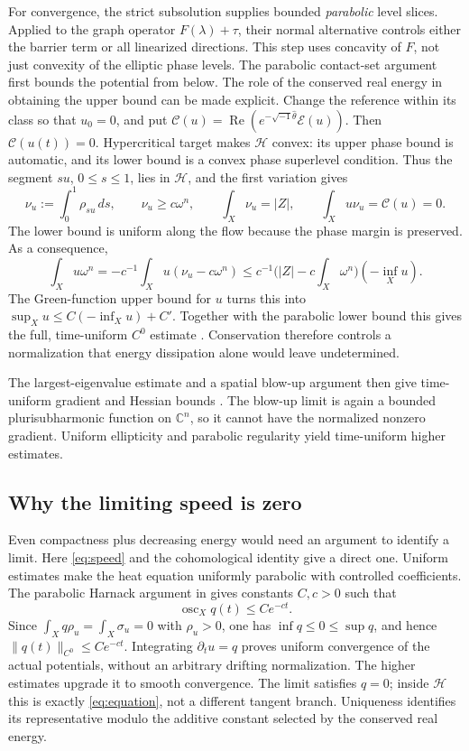 \documentclass[12pt,reqno]{amsart}
\newcommand{\ii}{\sqrt{-1}}
\newcommand{\C}{\mathbb C}
\newcommand{\hth}{\widehat\theta}
\newcommand{\osc}{\operatorname{osc}}
\newcommand{\Ree}{\operatorname{Re}}
\begin{document}
For convergence, the strict subsolution supplies bounded \emph{parabolic} level slices. Applied to the graph operator $F(\lambda)+\tau$, their normal alternative controls either the barrier term or all linearized directions. This step uses concavity of $F$, not just convexity of the elliptic phase levels. The parabolic contact-set argument first bounds the potential from below. The role of the conserved real energy in obtaining the upper bound can be made explicit. Change the reference within its class so that $u_0=0$, and put $\mathcal C(u)=\Ree(e^{-\ii\hth}\mathcal E(u))$. Then $\mathcal C(u(t))=0$. Hypercritical target makes $\mathcal H$ convex: its upper phase bound is automatic, and its lower bound is a convex phase superlevel condition. Thus the segment $su$, $0\leq s\leq1$, lies in $\mathcal H$, and the first variation gives
\[
 \nu_u:=\int_0^1\rho_{su}\,ds,\qquad
 \nu_u\geq c\omega^n,\qquad \int_X\nu_u=|Z|,
 \qquad \int_Xu\nu_u=\mathcal C(u)=0.
\]
The lower bound is uniform along the flow because the phase margin is preserved. As a consequence,
\[
 \int_Xu\omega^n=-c^{-1}\int_Xu(\nu_u-c\omega^n)
 \leq c^{-1}\bigl(|Z|-c\int_X\omega^n\bigr)(-\inf_Xu).
\]
The Green-function upper bound for $u$ turns this into $\sup_Xu\leq C(-\inf_Xu)+C'$. Together with the parabolic lower bound this gives the full, time-uniform $C^0$ estimate \cite[Proposition 2.4 and Lemma 5.3]{Tak}. Conservation therefore controls a normalization that energy dissipation alone would leave undetermined.

The largest-eigenvalue estimate and a spatial blow-up argument then give time-uniform gradient and Hessian bounds \cite[Section 5.2]{Tak}. The blow-up limit is again a bounded plurisubharmonic function on $\C^n$, so it cannot have the normalized nonzero gradient. Uniform ellipticity and parabolic regularity yield time-uniform higher estimates.

\subsection{Why the limiting speed is zero}
Even compactness plus decreasing energy would need an argument to identify a limit. Here \eqref{eq:speed} and the cohomological identity give a direct one. Uniform estimates make the heat equation uniformly parabolic with controlled coefficients. The parabolic Harnack argument in \cite[Section 5.3]{Tak} gives constants $C,c>0$ such that
\[
 \osc_Xq(t)\leq Ce^{-ct}.
\]
Since $\int_Xq\rho_u=\int_X\sigma_u=0$ with $\rho_u>0$, one has $\inf q\leq0\leq\sup q$, and hence $\|q(t)\|_{C^0}\leq Ce^{-ct}$. Integrating $\partial_tu=q$ proves uniform convergence of the actual potentials, without an arbitrary drifting normalization. The higher estimates upgrade it to smooth convergence. The limit satisfies $q=0$; inside $\mathcal H$ this is exactly \eqref{eq:equation}, not a different tangent branch. Uniqueness identifies its representative modulo the additive constant selected by the conserved real energy.
\end{document}
